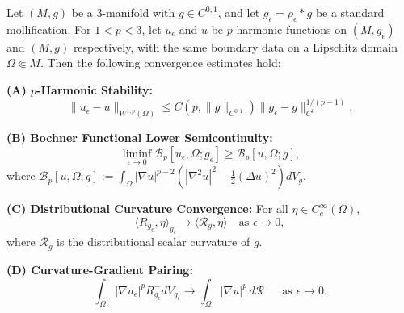 \begin{lemma}\label{lem:Step3Convergence}
Let $(M, g)$ be a 3-manifold with $g \in C^{0,1}$, and let $g_\epsilon = \rho_\epsilon * g$ be a standard mollification. For $1 < p < 3$, let $u_\epsilon$ and $u$ be $p$-harmonic functions on $(M, g_\epsilon)$ and $(M, g)$ respectively, with the same boundary data on a Lipschitz domain $\Omega \Subset M$. Then the following convergence estimates hold:

\textbf{(A) $p$-Harmonic Stability:}
\begin{equation}\label{eq:PHarmonicStability}
    \|u_\epsilon - u\|_{W^{1,p}(\Omega)} \le C(p, \|g\|_{C^{0,1}}) \|g_\epsilon - g\|_{C^0}^{1/(p-1)}.
\end{equation}

\textbf{(B) Bochner Functional Lower Semicontinuity:}
\begin{equation}\label{eq:BochnerLSC}
    \liminf_{\epsilon \to 0} \mathcal{B}_p[u_\epsilon, \Omega; g_\epsilon] \ge \mathcal{B}_p[u, \Omega; g],
\end{equation}
where $\mathcal{B}_p[u, \Omega; g] := \int_\Omega |\nabla u|^{p-2}(|\nabla^2 u|^2 - \frac{1}{2}(\Delta u)^2) dV_g$.

\textbf{(C) Distributional Curvature Convergence:}
For all $\eta \in C^\infty_c(\Omega)$,
\begin{equation}\label{eq:CurvatureDistributional}
    \langle R_{g_\epsilon}, \eta \rangle_{g_\epsilon} \to \langle \mathcal{R}_g, \eta \rangle \quad \text{as } \epsilon \to 0,
\end{equation}
where $\mathcal{R}_g$ is the distributional scalar curvature of $g$.

\textbf{(D) Curvature-Gradient Pairing:}
\begin{equation}\label{eq:CurvatureGradientPairing}
    \int_\Omega |\nabla u_\epsilon|^p R_{g_\epsilon}^- dV_{g_\epsilon} \to \int_\Omega |\nabla u|^p \, d\mathcal{R}^- \quad \text{as } \epsilon \to 0.
\end{equation}
\end{lemma}

